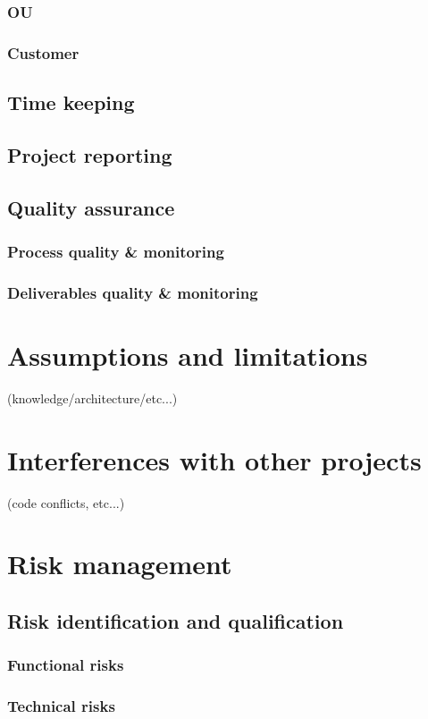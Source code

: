 \documentclass[a4paper,12pt,abstracton,titlepage]{scrartcl}
\begin{document}
\subsubsection{OU}
\subsubsection{Customer}
\subsection{Time keeping}
\subsection{Project reporting}
\subsection{Quality assurance}
\subsubsection{Process quality \& monitoring}
\subsubsection{Deliverables quality \& monitoring}

\section{Assumptions and limitations}
(knowledge/architecture/etc...)

\section{Interferences with other projects}
(code conflicts, etc...)

\section{Risk management}
\subsection{Risk identification and qualification}
\subsubsection{Functional risks}
\subsubsection{Technical risks}
\end{document}
